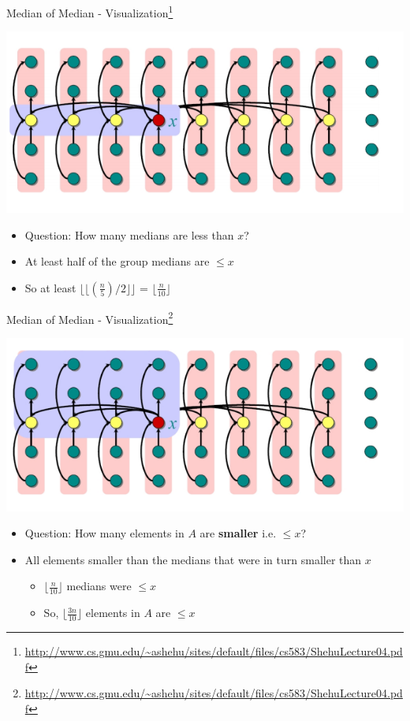 \documentclass{beamer}
\begin{document}
\begin{frame}{Median of Median - Visualization\footnote{\url{http://www.cs.gmu.edu/~ashehu/sites/default/files/cs583/ShehuLecture04.pdf}}}
\begin{center}
    \includegraphics[scale=0.4]{medianOfMedian5.png}
\end{center}
\begin{itemize}
    \item Question: How many medians are less than $x$? \pause
    \item At least half of the group medians are $\leq x$
    \item So at least $\lfloor \lfloor \left( \frac{n}{5} \right) / 2 \rfloor \rfloor$  = $\lfloor \frac{n}{10} \rfloor$
\end{itemize}
\end{frame}




\begin{frame}{Median of Median - Visualization\footnote{\url{http://www.cs.gmu.edu/~ashehu/sites/default/files/cs583/ShehuLecture04.pdf}}}
\begin{center}
    \includegraphics[scale=0.4]{medianOfMedian6.png}
\end{center}
\begin{itemize}
    \item Question: How many elements in  $A$ are {\bf smaller} i.e. $\leq x$? \pause
    \item All elements smaller than the medians that were in turn smaller than $x$ 
    \begin{itemize}
        \item $\lfloor \frac{n}{10} \rfloor$ medians were $\leq x$
        \item So, $\lfloor \frac{3n}{10} \rfloor$ elements in $A$ are $\leq x$
    \end{itemize}
\end{itemize}
\end{frame}
\end{document}
